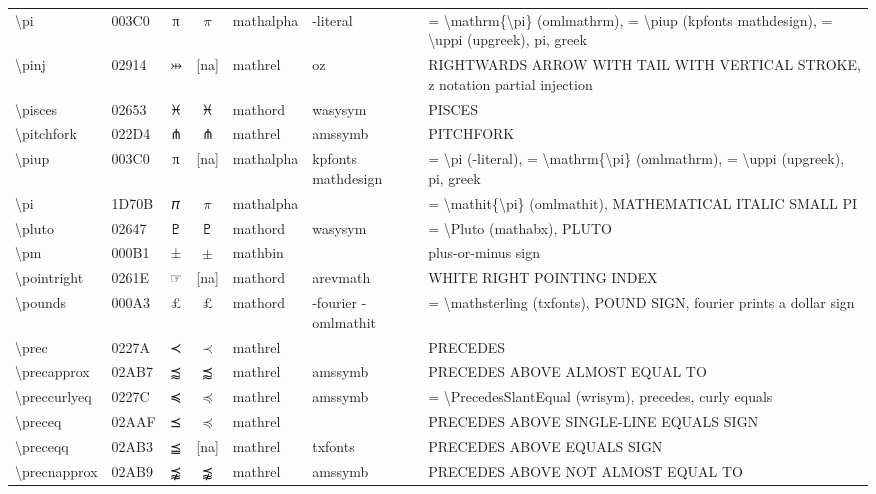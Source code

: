 \documentclass[a4paper,landscape]{article}
\begin{document}
\begin{longtable}{llcclll}
\textbackslash{}pi & 003C0 & π & $\pi$ & mathalpha & -literal & = \textbackslash{}mathrm\{\textbackslash{}pi\} (omlmathrm), = \textbackslash{}piup (kpfonts mathdesign), = \textbackslash{}uppi (upgreek), pi, greek \\
\textbackslash{}pinj & 02914 & ⤔ & [na] & mathrel & oz & RIGHTWARDS ARROW WITH TAIL WITH VERTICAL STROKE, z notation partial injection \\
\textbackslash{}pisces & 02653 & \textsf ♓ & $\pisces$ & mathord & wasysym & PISCES \\
\textbackslash{}pitchfork & 022D4 & ⋔ & $\pitchfork$ & mathrel & amssymb & PITCHFORK \\
\textbackslash{}piup & 003C0 & π & [na] & mathalpha & kpfonts mathdesign & = \textbackslash{}pi (-literal), = \textbackslash{}mathrm\{\textbackslash{}pi\} (omlmathrm),  = \textbackslash{}uppi (upgreek),  pi,  greek \\
\textbackslash{}pi & 1D70B & 𝜋 & $\pi$ & mathalpha &  & = \textbackslash{}mathit\{\textbackslash{}pi\} (omlmathit), MATHEMATICAL ITALIC SMALL PI \\
\textbackslash{}pluto & 02647 & \textsf ♇ & $\pluto$ & mathord & wasysym & = \textbackslash{}Pluto (mathabx), PLUTO \\
\textbackslash{}pm & 000B1 & ± & $\pm$ & mathbin &  & plus-or-minus sign \\
\textbackslash{}pointright & 0261E & ☞ & [na] & mathord & arevmath & WHITE RIGHT POINTING INDEX \\
\textbackslash{}pounds & 000A3 & £ & $\pounds$ & mathord & -fourier -omlmathit & = \textbackslash{}mathsterling (txfonts), POUND SIGN, fourier prints a dollar sign \\
\textbackslash{}prec & 0227A & ≺ & $\prec$ & mathrel &  & PRECEDES \\
\textbackslash{}precapprox & 02AB7 & ⪷ & $\precapprox$ & mathrel & amssymb & PRECEDES ABOVE ALMOST EQUAL TO \\
\textbackslash{}preccurlyeq & 0227C & ≼ & $\preccurlyeq$ & mathrel & amssymb & = \textbackslash{}PrecedesSlantEqual (wrisym), precedes, curly equals \\
\textbackslash{}preceq & 02AAF & ⪯ & $\preceq$ & mathrel &  & PRECEDES ABOVE SINGLE-LINE EQUALS SIGN \\
\textbackslash{}preceqq & 02AB3 & ⪳ & [na] & mathrel & txfonts & PRECEDES ABOVE EQUALS SIGN \\
\textbackslash{}precnapprox & 02AB9 & ⪹ & $\precnapprox$ & mathrel & amssymb & PRECEDES ABOVE NOT ALMOST EQUAL TO \\

\end{longtable}
\end{document}
